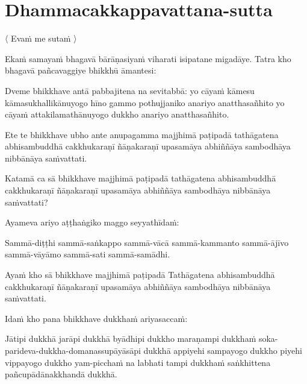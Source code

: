 \section{Dhammacakkappavattana-sutta}

\begin{leader}
  〈 Evaṁ me sutaṁ 〉
\end{leader}

\begin{pali-hang}
Ekaṁ samayaṁ bhagavā bārāṇasiyaṁ viharati isipatane migadāye. Tatra kho bhagavā pañcavaggiye bhikkhū āmantesi:
\end{pali-hang}

\begin{pali-hang}
Dveme bhikkhave antā pabbajitena na sevitabbā: yo cāyaṁ kāmesu kāmasukhallikānuyogo hīno gammo pothujjaniko anariyo anatthasañhito yo cāyaṁ attakilamathānuyogo dukkho anariyo anatthasañhito.
\end{pali-hang}

\begin{pali-hang}
Ete te bhikkhave ubho ante anupagamma majjhimā paṭipadā tathāgatena abhisambuddhā cakkhukaraṇī ñāṇakaraṇī upasamāya abhiññāya sambodhāya nibbānāya saṁvattati.
\end{pali-hang}

\begin{pali-hang}
Katamā ca sā bhikkhave majjhimā paṭipadā tathāgatena abhisambuddhā cakkhukaraṇī ñāṇakaraṇī upasamāya abhiññāya sambodhāya nibbānāya saṁvattati?
\end{pali-hang}

\begin{pali-hang}
Ayameva ariyo aṭṭhaṅgiko maggo seyyathīdaṁ:
\end{pali-hang}

\begin{pali-hang}
Sammā-diṭṭhi sammā-saṅkappo sammā-vācā sammā-kammanto sammā-ājīvo sammā-vāyāmo sammā-sati sammā-samādhi.
\end{pali-hang}

\begin{pali-hang}
Ayaṁ kho sā bhikkhave majjhimā paṭipadā Tathāgatena abhisambuddhā cakkhukaraṇī ñāṇakaraṇī upasamāya abhiññāya sambodhāya nibbānāya saṁvattati.
\end{pali-hang}

\begin{pali-hang}
Idaṁ kho pana bhikkhave dukkhaṁ ariyasaccaṁ:
\end{pali-hang}

\begin{pali-hang}
Jātipi dukkhā jarāpi dukkhā byādhipi dukkho maraṇampi dukkhaṁ soka-parideva-dukkha-domanassupāyāsāpi dukkhā appiyehi sampayogo dukkho piyehi vippayogo dukkho yam-picchaṁ na labhati tampi dukkhaṁ saṅkhittena pañcupādānakkhandā dukkhā.
\end{pali-hang}

